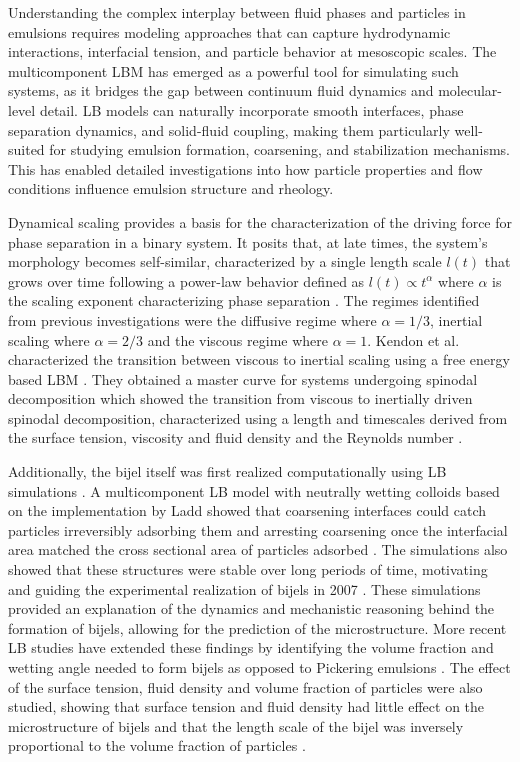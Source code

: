Understanding the complex interplay between fluid phases and particles in emulsions requires modeling approaches that can capture hydrodynamic interactions, interfacial tension, and particle 
behavior at mesoscopic scales. The multicomponent LBM has emerged as a powerful tool for simulating such systems, as it bridges the gap between continuum fluid dynamics 
and molecular-level detail. LB models can naturally incorporate smooth interfaces, phase separation dynamics, and solid-fluid coupling, making them particularly well-suited for studying 
emulsion formation, coarsening, and stabilization mechanisms. This has enabled detailed investigations into how particle properties and flow conditions influence emulsion structure and rheology.

Dynamical scaling provides a basis for the characterization of the driving force for phase separation in a binary system. It posits that, at late times, the system's 
morphology becomes self-similar, characterized by a single length scale \( l(t) \) that grows over time following a power-law behavior defined as $l(t) \propto t^{\alpha}$ where $\alpha$ is
the scaling exponent characterizing phase separation \cite{siggia_late_1979, furukawa_role_1994}.
The regimes identified from previous investigations were the diffusive regime where $\alpha = 1/3$, inertial scaling where $\alpha = 2/3$ and the viscous regime where $\alpha = 1$.
Kendon et al. characterized the transition between viscous to inertial scaling using a free energy based LBM \cite{kendon_inertial_2001, kendon_3d_1999}. They obtained a master 
curve for systems undergoing spinodal decomposition which showed the transition from viscous to inertially driven spinodal decomposition, characterized using a length and timescales 
derived from the surface tension, viscosity and fluid density and the Reynolds number \cite{kendon_inertial_2001, kendon_3d_1999}.

Additionally, the bijel itself was first realized computationally using LB simulations \cite{stratford_colloidal_2005}. A multicomponent LB model with neutrally wetting colloids based on the 
implementation by Ladd showed that coarsening interfaces could catch particles irreversibly adsorbing them and arresting coarsening once the interfacial area matched the cross sectional area of 
particles adsorbed \cite{stratford_colloidal_2005,ladd_numerical_1994}. The simulations also showed that these structures were stable over long periods of time, motivating and guiding the 
experimental realization of bijels in 2007 \cite{herzig_bicontinuous_2007}. These simulations provided an explanation of the dynamics and mechanistic reasoning behind the formation of bijels, 
allowing for the prediction of the microstructure. More recent LB studies have extended these findings by identifying the volume fraction and wetting angle needed to form bijels as opposed to 
Pickering emulsions \cite{jansen_bijels_2011}. The effect of the surface tension, fluid density and volume fraction of particles were also studied, showing that surface tension and fluid density 
had little effect on the microstructure of bijels and that the length scale of the bijel was inversely proportional to the volume fraction of particles \cite{jansen_bijels_2011}.

